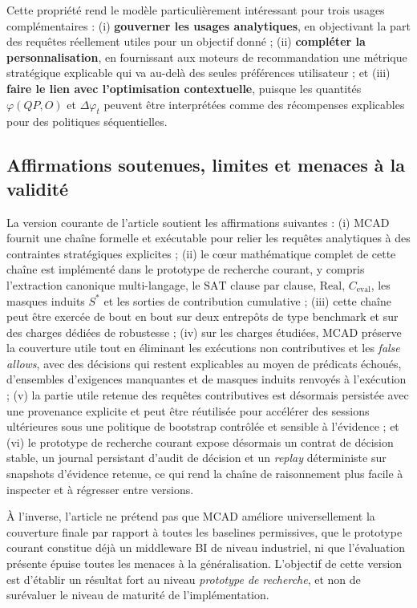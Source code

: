 \documentclass[journal]{IEEEtran}
\begin{document}
Cette propriété rend le modèle particulièrement intéressant pour trois usages complémentaires : (i) \textbf{gouverner les usages analytiques}, en objectivant la part des requêtes réellement utiles pour un objectif donné ; (ii) \textbf{compléter la personnalisation}, en fournissant aux moteurs de recommandation une métrique stratégique explicable qui va au-delà des seules préférences utilisateur ; et (iii) \textbf{faire le lien avec l'optimisation contextuelle}, puisque les quantités $\varphi(QP,O)$ et $\Delta\varphi_t$ peuvent être interprétées comme des récompenses explicables pour des politiques séquentielles.

\subsection{Affirmations soutenues, limites et menaces à la validité}

La version courante de l'article soutient les affirmations suivantes : (i) MCAD fournit une chaîne formelle et exécutable pour relier les requêtes analytiques à des contraintes stratégiques explicites ; (ii) le cœur mathématique complet de cette chaîne est implémenté dans le prototype de recherche courant, y compris l'extraction canonique multi-langage, le $\mathrm{SAT}$ clause par clause, $\mathrm{Real}$, $C_{\mathrm{eval}}$, les masques induits $S^*$ et les sorties de contribution cumulative ; (iii) cette chaîne peut être exercée de bout en bout sur deux entrepôts de type benchmark et sur des charges dédiées de robustesse ; (iv) sur les charges étudiées, MCAD préserve la couverture utile tout en éliminant les exécutions non contributives et les \emph{false allows}, avec des décisions qui restent explicables au moyen de prédicats échoués, d'ensembles d'exigences manquantes et de masques induits renvoyés à l'exécution ; (v) la partie utile retenue des requêtes contributives est désormais persistée avec une provenance explicite et peut être réutilisée pour accélérer des sessions ultérieures sous une politique de bootstrap contrôlée et sensible à l'évidence ; et (vi) le prototype de recherche courant expose désormais un contrat de décision stable, un journal persistant d'audit de décision et un \emph{replay} déterministe sur snapshots d'évidence retenue, ce qui rend la chaîne de raisonnement plus facile à inspecter et à régresser entre versions.

À l'inverse, l'article ne prétend pas que MCAD améliore universellement la couverture finale par rapport à toutes les baselines permissives, que le prototype courant constitue déjà un middleware BI de niveau industriel, ni que l'évaluation présente épuise toutes les menaces à la généralisation. L'objectif de cette version est d'établir un résultat fort au niveau \emph{prototype de recherche}, et non de surévaluer le niveau de maturité de l'implémentation.
\end{document}
